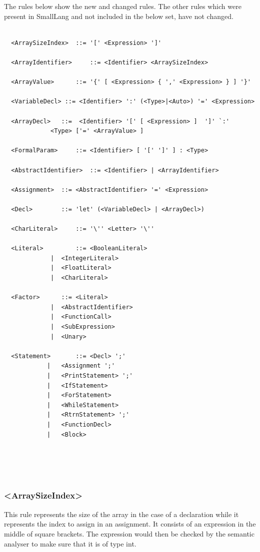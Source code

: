 \documentclass{article}
\begin{document}
				The rules below show the new and changed rules. The other rules which were present in SmallLang and not included in the below set, have not changed.
				
				\begin{lstlisting}[backgroundcolor=\color{lightgray},basicstyle=\small,upquote=true]
				
  <ArraySizeIndex> 	::= '[' <Expression> ']'
  
  <ArrayIdentifier> 	::= <Identifier> <ArraySizeIndex>
  
  <ArrayValue> 		::= '{' [ <Expression> { ',' <Expression> } ] '}'
  
  <VariableDecl> ::= <Identifier> ':' (<Type>|<Auto>) '=' <Expression> 
  
  <ArrayDecl> 	::=  <Identifier> '[' [ <Expression> ]  ']' `:' 
  		     <Type> ['=' <ArrayValue> ] 
  
  <FormalParam> 	::= <Identifier> [ '[' ']' ] : <Type>
  
  <AbstractIdentifier>	::= <Identifier> | <ArrayIdentifier>
  
  <Assignment>	::= <AbstractIdentifier> '=' <Expression>
  
  <Decl> 		::= 'let' (<VariableDecl> | <ArrayDecl>)
  
  <CharLiteral>  	::= '\'' <Letter> '\''
  
  <Literal> 		::= <BooleanLiteral>
  			 |  <IntegerLiteral>
  			 |  <FloatLiteral>
  			 |  <CharLiteral>
  					
  <Factor> 		::= <Literal>
  			 |  <AbstractIdentifier>
  			 |  <FunctionCall>
  			 |  <SubExpression>
  			 |  <Unary>
  
  <Statement> 		::= <Decl> ';'
  			|   <Assignment ';'
  			|   <PrintStatement> ';'
  			|   <IfStatement> 
  			|   <ForStatement> 
  			|   <WhileStatement> 
  			|   <RtrnStatement> ';'
  			|   <FunctionDecl>
  			|   <Block>
  
  
  	
				  
				\end{lstlisting}
				
				
				\subsubsection{\textless ArraySizeIndex\textgreater}
				
				This rule represents the size of the array in the case of a declaration while it represents the index to assign in an assignment. It consists of an expression in the middle of square brackets. The expression would then be checked by the semantic analyser to make sure that it is of type int.
				
\end{document}
